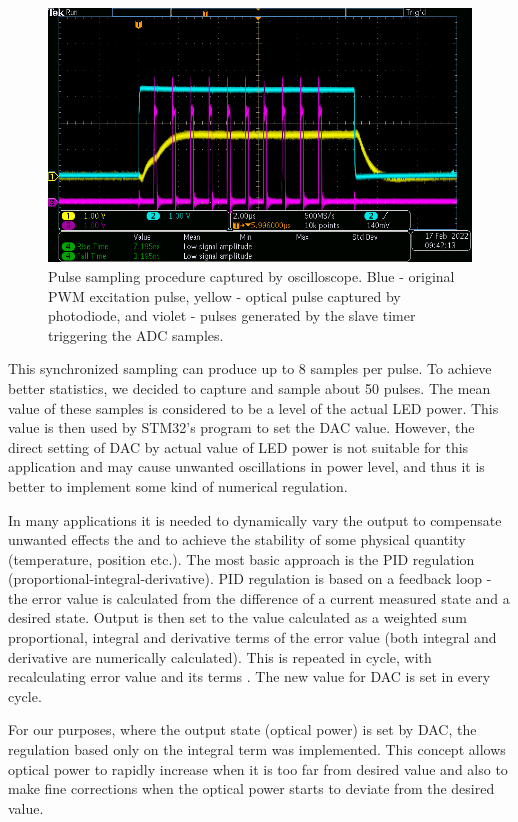 \begin{figure}[H]
 \centering
 \includegraphics[scale=0.5]{./pictures/PWMSampling.png}
 \caption{Pulse sampling procedure captured by oscilloscope. Blue - original PWM excitation pulse, yellow - optical pulse captured by photodiode, and violet - pulses generated by the slave timer triggering the ADC samples.}
 \label{procedure}
\end{figure}
\par
This synchronized sampling can produce up to 8 samples per pulse. To achieve better statistics, we decided to capture and sample about 50 pulses. The mean value of these samples is considered to be a level of the actual LED power. This value is then used by STM32's program to set the DAC value. However, the direct setting of DAC by actual value of LED power is not suitable for this application and may cause unwanted oscillations in power level, and thus it is better to implement some kind of numerical regulation.


\par
In many applications it is needed to dynamically vary the output to compensate unwanted effects the and to achieve the stability of some physical quantity (temperature, position etc.). The most basic approach is the PID regulation (proportional-integral-derivative). PID regulation is based on a feedback loop - the error value is calculated from the difference of a current measured state and a desired state. Output is then set to the value calculated as a weighted sum proportional, integral and derivative terms of the error value (both integral and derivative are numerically calculated). This is repeated in cycle, with recalculating error value and its terms \cite{PID}. The new value for DAC is set in every cycle.

\par
For our purposes, where the output state (optical power) is set by DAC, the regulation based only on the integral term was implemented. This concept allows optical power to rapidly increase when it is too far from desired value and also to make fine corrections when the optical power starts to deviate from the desired value. 

